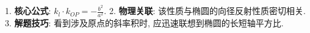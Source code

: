 \begin{summarybox}
1. \textbf{核心公式}: $k_l \cdot k_{OP} = -\frac{b^2}{a^2}$.
2. \textbf{物理关联}: 该性质与椭圆的向径反射性质密切相关.
3. \textbf{解题技巧}: 看到涉及原点的斜率积时, 应迅速联想到椭圆的长短轴平方比.
\end{summarybox}